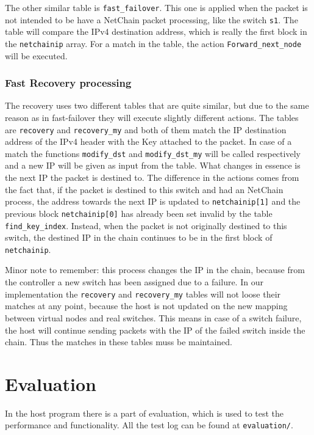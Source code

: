 \documentclass[11pt,oneside,a4paper]{article}
\begin{document}
The other similar table is {\color{red}\texttt{fast\_failover}}. This one is applied when the packet is not intended to be have a NetChain packet processing, like the switch {\color{brown}\texttt{s1}}. The table will compare the IPv4 destination address, which is really the first block in the {\color{red}\texttt{netchainip}} array. For a match in the table, the action {\color{red}\texttt{Forward\_next\_node}} will be executed. 

\subsubsection{Fast Recovery processing}
The recovery uses two different tables that are quite similar, but due to the same reason as in fast-failover they will execute slightly different actions. The tables are {\color{red}\texttt{recovery}} and {\color{red}\texttt{recovery\_my}} and both of them match the IP destination address of the IPv4 header with the Key attached to the packet. In case of a match the functions {\color{red}\texttt{modify\_dst}} and {\color{red}\texttt{modify\_dst\_my}} will be called respectively and a new IP will be given as input from the table. What changes in essence is the next IP the packet is destined to. The difference in the actions comes from the fact that, if the packet is destined to this switch and had an NetChain process, the address towards the next IP is updated to {\color{red}\texttt{netchainip[1]}} and the previous block {\color{red}\texttt{netchainip[0]}} has already been set invalid by the table {\color{red}\texttt{find\_key\_index}}. Instead, when the packet is not originally destined to this switch, the destined IP in the chain continues to be in the first block of {\color{red}\texttt{netchainip}}. 

Minor note to remember: this process changes the IP in the chain, because from the controller a new switch has been assigned due to a failure. In our implementation the {\color{red}\texttt{recovery}} and {\color{red}\texttt{recovery\_my}} tables will not loose their matches at any point, because the host is not updated on the new mapping between virtual nodes and real switches. This means in case of a switch failure, the host will continue sending packets with the IP of the failed switch inside the chain. Thus the matches in these tables muss be maintained. 

\section{Evaluation}
In the host program there is a part of evaluation, which is used to test the performance and functionality. All the test log can be found at \texttt{evaluation/}.
\end{document}
